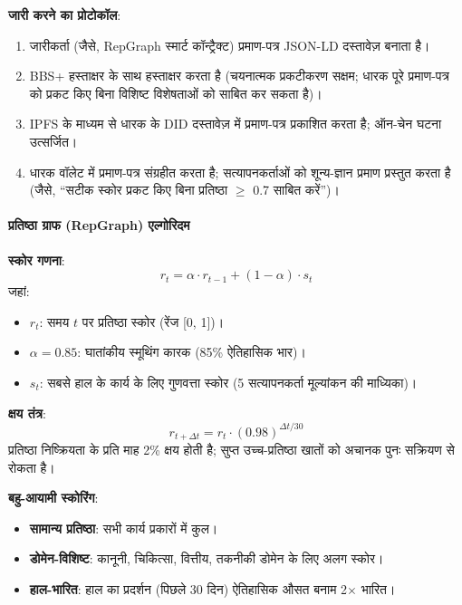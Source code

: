 \documentclass[11pt]{article}
\begin{document}
\begin{itemize}[noitemsep]
\begin{itemize}[noitemsep]
\textbf{जारी करने का प्रोटोकॉल}:
\begin{enumerate}[noitemsep]
  \item जारीकर्ता (जैसे, RepGraph स्मार्ट कॉन्ट्रैक्ट) प्रमाण-पत्र JSON-LD दस्तावेज़ बनाता है।
  \item BBS+ हस्ताक्षर के साथ हस्ताक्षर करता है (चयनात्मक प्रकटीकरण सक्षम; धारक पूरे प्रमाण-पत्र को प्रकट किए बिना विशिष्ट विशेषताओं को साबित कर सकता है)।
  \item IPFS के माध्यम से धारक के DID दस्तावेज़ में प्रमाण-पत्र प्रकाशित करता है; ऑन-चेन घटना उत्सर्जित।
  \item धारक वॉलेट में प्रमाण-पत्र संग्रहीत करता है; सत्यापनकर्ताओं को शून्य-ज्ञान प्रमाण प्रस्तुत करता है (जैसे, ``सटीक स्कोर प्रकट किए बिना प्रतिष्ठा $\geq$ 0.7 साबित करें'')।
\end{enumerate}

\paragraph{प्रतिष्ठा ग्राफ (RepGraph) एल्गोरिदम}

\textbf{स्कोर गणना}:
\begin{equation}
r_t = \alpha \cdot r_{t-1} + (1 - \alpha) \cdot s_t
\end{equation}
जहां:
\begin{itemize}[noitemsep]
  \item $r_t$: समय $t$ पर प्रतिष्ठा स्कोर (रेंज [0, 1])।
  \item $\alpha = 0.85$: घातांकीय स्मूथिंग कारक (85\% ऐतिहासिक भार)।
  \item $s_t$: सबसे हाल के कार्य के लिए गुणवत्ता स्कोर (5 सत्यापनकर्ता मूल्यांकन की माध्यिका)।
\end{itemize}

\textbf{क्षय तंत्र}:
\begin{equation}
r_{t+\Delta t} = r_t \cdot (0.98)^{\Delta t / 30}
\end{equation}
प्रतिष्ठा निष्क्रियता के प्रति माह 2\% क्षय होती है; सुप्त उच्च-प्रतिष्ठा खातों को अचानक पुनः सक्रियण से रोकता है।

\textbf{बहु-आयामी स्कोरिंग}:
\begin{itemize}[noitemsep]
  \item \textbf{सामान्य प्रतिष्ठा}: सभी कार्य प्रकारों में कुल।
  \item \textbf{डोमेन-विशिष्ट}: कानूनी, चिकित्सा, वित्तीय, तकनीकी डोमेन के लिए अलग स्कोर।
  \item \textbf{हाल-भारित}: हाल का प्रदर्शन (पिछले 30 दिन) ऐतिहासिक औसत बनाम 2$\times$ भारित।
\end{itemize}


\end{itemize}
\end{itemize}
\end{document}
